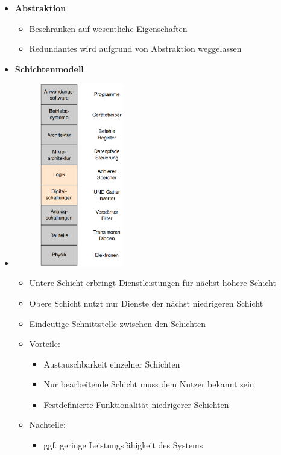 \documentclass[11pt,a4paper]{article}
\begin{document}
\begin{itemize}

\item \textbf{Abstraktion}
	\begin{itemize}
	\item Beschränken auf wesentliche Eigenschaften
	\item Redundantes wird aufgrund von Abstraktion weggelassen
	\end{itemize}

\item \textbf{Schichtenmodell}
\item[] 
	\begin{minipage}{0.225\textwidth}
		\begin{figure}[H]
		\includegraphics[height=8cm]{schichtenmodell}
		\end{figure}
	\end{minipage}
	\begin{minipage}[t]{0.7\textwidth}
		\vspace{-3.5cm}
		\begin{itemize}
		\item Untere Schicht erbringt Dienstleistungen für nächst höhere Schicht
		\item Obere Schicht nutzt nur Dienste der nächst niedrigeren Schicht
		\item Eindeutige Schnittstelle zwischen den Schichten
		\item Vorteile: 
			\begin{itemize}
			\item Austauschbarkeit einzelner Schichten
			\item Nur bearbeitende Schicht muss dem Nutzer bekannt sein
			\item Festdefinierte Funktionalität niedrigerer Schichten
			\end{itemize}
		\item Nachteile:
			\begin{itemize}
			\item ggf. geringe Leistungsfähigkeit des Systems
			\end{itemize}
		\end{itemize}
	\end{minipage}


\end{itemize}
\end{document}
